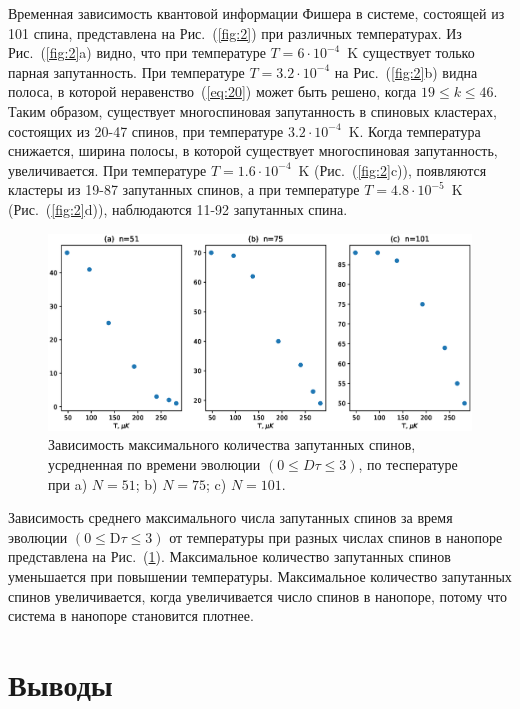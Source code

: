 \documentclass[review]{elsarticle}
\begin{document}
Временная зависимость квантовой информации Фишера в системе, состоящей из 101 спина, представлена на Рис.~(\ref{fig:2}) при различных температурах.
Из Рис.~(\ref{fig:2}a) видно, что при температуре $T=6\cdot10^{-4}$~K существует только парная запутанность.
При температуре $T=3.2\cdot10^{-4}$ на Рис.~(\ref{fig:2}b) видна полоса, в которой неравенство~(\ref{eq:20}) может быть решено, когда $19 \leq k \leq 46$.
Таким образом, существует многоспиновая запутанность в спиновых кластерах, состоящих из 20-47 спинов, при температуре $3.2\cdot10^{-4}$~K.
Когда температура снижается, ширина полосы, в которой существует многоспиновая запутанность, увеличивается.
При температуре $T=1.6\cdot10^{-4}$~K (Рис.~(\ref{fig:2}c)), появляются кластеры из 19-87 запутанных спинов, а при температуре $T=4.8\cdot10^{-5}$~K (Рис.~(\ref{fig:2}d)), наблюдаются 11-92 запутанных спина.

\begin{figure}
  	\includegraphics[width=0.95\linewidth]{entangled_spins_by_n.eps}
	\caption{
	    Зависимость максимального количества запутанных спинов,
	    усредненная по времени эволюции $(0 \leq D\tau \leq 3)$, 
	    по теспературе при a) $N=51$; b) $N=75$; c) $N=101$.
	}
	\label{fig:3}
\end{figure}

Зависимость среднего максимального числа запутанных спинов за время эволюции $({0}\leq \mathrm{D}\tau\leq{3})$ от температуры при разных числах спинов в нанопоре представлена на Рис.~(\ref{fig:3}).
Максимальное количество запутанных спинов уменьшается при повышении температуры.
Максимальное количество запутанных спинов увеличивается, когда увеличивается число спинов в нанопоре, потому что система в нанопоре становится плотнее.



\section{Выводы}
\label{sec:6}
\end{document}

